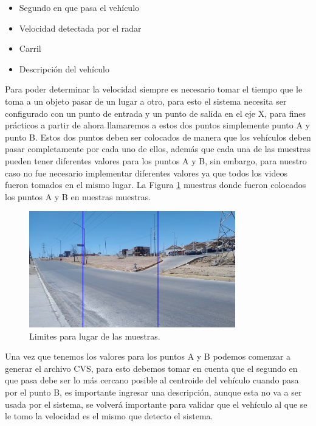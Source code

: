 \begin{itemize}
    \item Segundo en que pasa el vehículo
    \item Velocidad detectada por el radar
    \item Carril
    \item Descripción del vehículo
\end{itemize}

Para poder determinar la velocidad siempre es necesario tomar el tiempo que le toma a un objeto pasar de un lugar a otro, para esto el sistema necesita ser configurado con un punto de entrada y un punto de salida en el eje X, para fines prácticos a partir de ahora llamaremos a estos dos puntos simplemente punto A y punto B.  Estos dos puntos deben ser colocados de manera que los vehículos deben pasar completamente por cada uno de ellos, además que cada una de las muestras pueden tener diferentes valores para los puntos A y B, sin embargo, para nuestro caso no fue necesario implementar diferentes valores ya que todos los videos fueron tomados en el mismo lugar. La Figura \ref{fig:LugarLimites} muestras donde fueron colocados los puntos A y B en nuestras muestras.

\begin{figure}[H]
    \centering
    \includegraphics[width=0.8\textwidth]{Metodologia/imgs/LugarLimites.jpg}
    \caption{Limites para lugar de las muestras.}
    \label{fig:LugarLimites}
\end{figure}

Una vez que tenemos los valores para los puntos A y B podemos comenzar a generar el archivo CVS, para esto debemos tomar en cuenta que el segundo en que pasa debe ser lo más cercano posible al centroide del vehículo cuando pasa por el punto B, es importante ingresar una descripción, aunque esta no va a ser usada por el sistema, se volverá importante para validar que el vehículo al que se le tomo la velocidad es el mismo que detecto el sistema.

